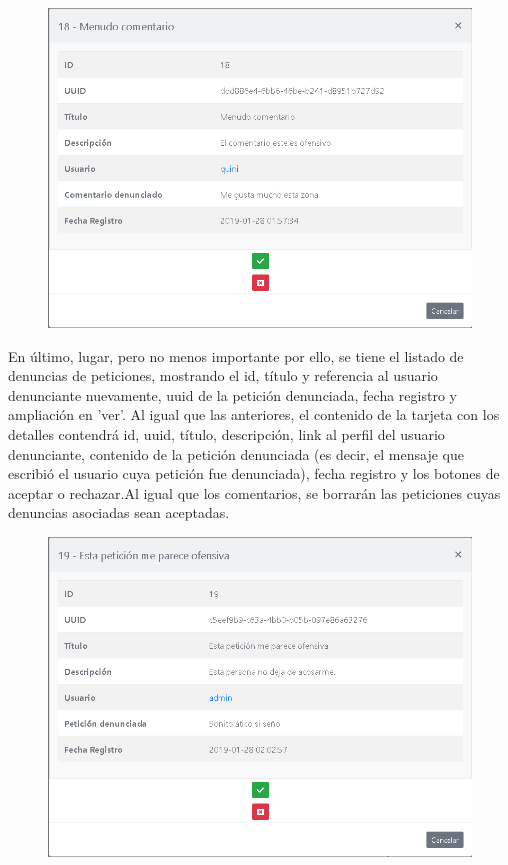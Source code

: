 \begin{figure}[h!]
\centering
\includegraphics[width=.5\textwidth]{Img/ManualUsuario/ADMIN_SHOW_REPORT_COMMENT.png}
\end{figure}

En \'{u}ltimo, lugar, pero no menos importante por ello, se tiene el listado de denuncias de peticiones, mostrando el id, t\'{i}tulo y referencia al usuario denunciante nuevamente, uuid de la petici\'{o}n denunciada, fecha registro y ampliaci\'{o}n en 'ver'. Al igual que las anteriores, el contenido de la tarjeta con los detalles contendr\'{a} id, uuid, t\'{i}tulo, descripci\'{o}n, link al perfil del usuario denunciante,  contenido de la petici\'{o}n denunciada (es decir, el mensaje que escribi\'{o} el usuario cuya petici\'{o}n fue denunciada), fecha registro y los botones de aceptar o rechazar.Al igual que los comentarios, se borrar\'{a}n las peticiones cuyas denuncias asociadas sean aceptadas.


\begin{figure}[h!]
\centering
\includegraphics[width=.5\textwidth]{Img/ManualUsuario/ADMIN_SHOW_REPORT_REQUEST.png}
\end{figure}